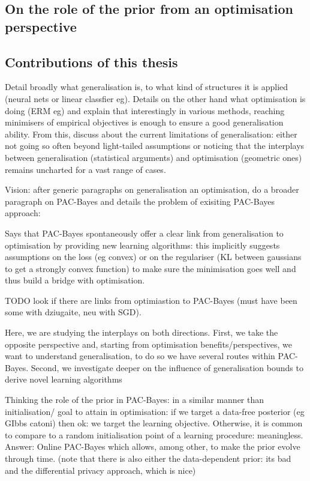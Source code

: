\subsection*{On the role of the prior from an optimisation perspective}

\subsection{Contributions of this thesis}

 

\newpage
Detail broadly what generalisation is, to what kind of structures it is applied (neural nets or linear classfier eg). Details on the other hand what optimisation is doing (ERM eg) and explain that interestingly in various methods, reaching minimisers of empirical objectives is enough to ensure a good generalisation ability. From this, discuss about the current limitations of generalisation: either not going so often beyond light-tailed assumptions or noticing that the interplays between generalisation (statistical arguments) and optimisation (geometric ones) remains uncharted for a vast range of cases.

Vision: after generic paragraphs on generalisation an optimisation, do a broader paragraph on PAC-Bayes and details the problem of exisiting PAC-Bayes approach: 

Says that PAC-Bayes spontaneously offer a clear link from generalisation to optimisation by providing new learning algorithms: this implicitly suggests assumptions on the loss (eg convex) or on the regulariser (KL between gaussians to get a strongly convex function) to make sure the minimisation goes well and thus build a bridge with optimisation.

TODO look if there are links from optimiastion to PAC-Bayes (must have been some with dziugaite, neu with SGD).

Here, we are studying the interplays on both directions. First, we take the opposite perspective and, starting from optimisation benefits/perspectives, we want to understand generalisation, to do so we have several routes within PAC-Bayes. Second, we investigate deeper on the influence of generalisation bounds to derive novel learning algorithms

Thinking the role of the prior in PAC-Bayes: in a similar manner than initialisation/ goal to attain in optimisation: if we target a data-free posterior (eg GIbbs catoni) then ok: we target the learning objective. Otherwise, it is common to compare to a random initialisation point of a learning procedure: meaningless. Answer: Online PAC-Bayes which allows, among other, to make the prior evolve through time. (note that there is also either the data-dependent prior: its bad and the differential privacy approach, which is nice)

